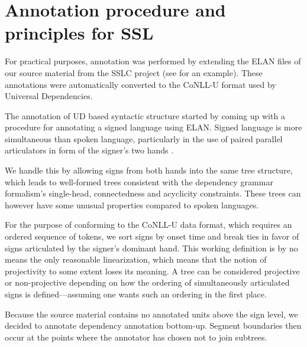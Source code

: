 \documentclass[11pt]{article}
\begin{document}
\section{Annotation procedure and principles for SSL}

For practical purposes, annotation was performed by extending the ELAN
files of our source material from the SSLC project (see
 for an example). These annotations were automatically
converted to the CoNLL-U format used by Universal Dependencies.

The annotation of UD based syntactic structure started by coming up with a procedure for annotating a signed language using ELAN. Signed language is more simultaneous than spoken language, particularly in the use of paired parallel articulators in form of the signer's two hands \cite{Vermeerbergen2007simultaneity}.

We handle this by allowing signs from both hands into the same tree structure,
which leads to well-formed trees consistent with the dependency grammar
formalism's single-head, connectedness and acyclicity constraints.
These trees can however have some unusual properties compared to spoken
languages.

For the purpose of conforming to the CoNLL-U data format,
which requires an ordered sequence of tokens, we sort
signs by onset time and break ties in favor of signs articulated by the
signer's dominant hand.
This working definition is by no means the only reasonable linearization,
which means that the notion of projectivity to some extent loses its meaning.
A tree can be considered projective or non-projective depending on how the
ordering of simultaneously articulated signs is defined---assuming one wants
such an ordering in the first place.

Because the source material contains no annotated units above the sign level,
we decided to annotate dependency annotation bottom-up. Segment boundaries
then occur at the points where the annotator has chosen not to join subtrees.
\end{document}
